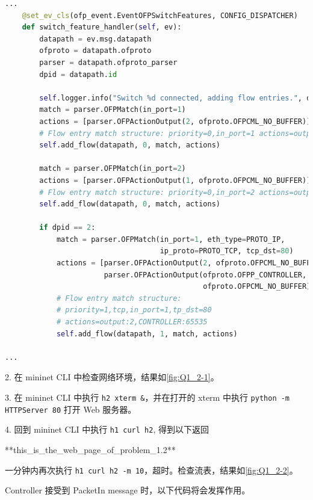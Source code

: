 \documentclass[format=draft,language=chinese,category=SDN]{hustreport}
\newcommand{\code}{\texttt}
\begin{document}
\begin{lstlisting}[language=python]
...
    @set_ev_cls(ofp_event.EventOFPSwitchFeatures, CONFIG_DISPATCHER)
    def switch_feature_handler(self, ev):
        datapath = ev.msg.datapath
        ofproto = datapath.ofproto
        parser = datapath.ofproto_parser
        dpid = datapath.id

        self.logger.info("Switch %d connected, adding flow entries.", dpid)
        match = parser.OFPMatch(in_port=1)
        actions = [parser.OFPActionOutput(2, ofproto.OFPCML_NO_BUFFER)]
        # Flow entry match structure: priority=0,in_port=1 actions=output:2
        self.add_flow(datapath, 0, match, actions)

        match = parser.OFPMatch(in_port=2)
        actions = [parser.OFPActionOutput(1, ofproto.OFPCML_NO_BUFFER)]
        # Flow entry match structure: priority=0,in_port=2 actions=output:1
        self.add_flow(datapath, 0, match, actions)

        if dpid == 2:
            match = parser.OFPMatch(in_port=1, eth_type=PROTO_IP,
                                    ip_proto=PROTO_TCP, tcp_dst=80)
            actions = [parser.OFPActionOutput(2, ofproto.OFPCML_NO_BUFFER),
                       parser.OFPActionOutput(ofproto.OFPP_CONTROLLER,
                                              ofproto.OFPCML_NO_BUFFER)]
            # Flow entry match structure:
            # priority=1,tcp,in_port=1,tp_dst=80
            # actions=output:2,CONTROLLER:65535
            self.add_flow(datapath, 1, match, actions)

...
\end{lstlisting}

2. 在 mininet CLI 中检查网络环境，结果如\autoref{fig:Q1_2-1}。

3. 在 mininet CLI 中执行 \code{h2 xterm \&}，并在打开的 xterm 中执行 \code{python -m HTTPServer 80} 打开 Web 服务器。

4. 回到 mininet CLI 中执行 \code{h1 curl h2}, 得到以下返回
\begin{center}
**this\_is\_the\_web\_page\_of\_problem\_1.2**
\end{center}
一分钟内再次执行 \code{h1 curl h2 -m 10}，超时。检查流表，结果如\autoref{fig:Q1_2-2}。

Controller 接受到 PacketIn message 时，以下代码将会发挥作用。
\end{document}
